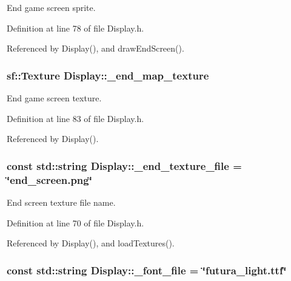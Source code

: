 End game screen sprite. 



Definition at line 78 of file Display.\-h.



Referenced by Display(), and draw\-End\-Screen().

\hypertarget{classDisplay_ad41d7097510e56a9f16e97d7cc13c5b6}{
\subsubsection[{\-\_\-end\-\_\-map\-\_\-texture}]{\setlength{\rightskip}{0pt plus 5cm}sf\-::\-Texture Display\-::\-\_\-end\-\_\-map\-\_\-texture\hspace{0.3cm}{\ttfamily [private]}}}\label{classDisplay_ad41d7097510e56a9f16e97d7cc13c5b6}


End game screen texture. 



Definition at line 83 of file Display.\-h.



Referenced by Display().

\hypertarget{classDisplay_ac8eb9dbc23ed61c56ea69adfdbfeecde}{
\subsubsection[{\-\_\-end\-\_\-texture\-\_\-file}]{\setlength{\rightskip}{0pt plus 5cm}const std\-::string Display\-::\-\_\-end\-\_\-texture\-\_\-file = \char`\"{}end\-\_\-screen.\-png\char`\"{}\hspace{0.3cm}{\ttfamily [private]}}}\label{classDisplay_ac8eb9dbc23ed61c56ea69adfdbfeecde}


End screen texture file name. 



Definition at line 70 of file Display.\-h.



Referenced by Display(), and load\-Textures().

\hypertarget{classDisplay_a69effabf34c7f71ddf83be77977b56f2}{
\subsubsection[{\-\_\-font\-\_\-file}]{\setlength{\rightskip}{0pt plus 5cm}const std\-::string Display\-::\-\_\-font\-\_\-file = \char`\"{}futura\-\_\-light.\-ttf\char`\"{}\hspace{0.3cm}{\ttfamily [private]}}}\label{classDisplay_a69effabf34c7f71ddf83be77977b56f2}


